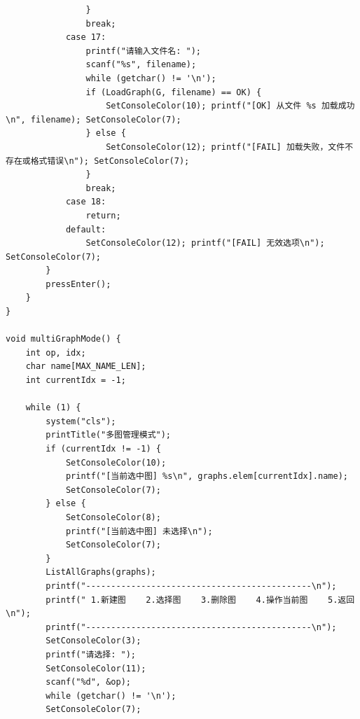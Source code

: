 \documentclass[supercite]{Experimental_Report}
\begin{document}
{\begin{lstlisting}
                }
                break;
            case 17:
                printf("请输入文件名: ");
                scanf("%s", filename);
                while (getchar() != '\n');
                if (LoadGraph(G, filename) == OK) {
                    SetConsoleColor(10); printf("[OK] 从文件 %s 加载成功\n", filename); SetConsoleColor(7);
                } else {
                    SetConsoleColor(12); printf("[FAIL] 加载失败，文件不存在或格式错误\n"); SetConsoleColor(7);
                }
                break;
            case 18:
                return;
            default:
                SetConsoleColor(12); printf("[FAIL] 无效选项\n"); SetConsoleColor(7);
        }
        pressEnter();
    }
}

void multiGraphMode() {
    int op, idx;
    char name[MAX_NAME_LEN];
    int currentIdx = -1;

    while (1) {
        system("cls");
        printTitle("多图管理模式");
        if (currentIdx != -1) {
            SetConsoleColor(10);
            printf("[当前选中图] %s\n", graphs.elem[currentIdx].name);
            SetConsoleColor(7);
        } else {
            SetConsoleColor(8);
            printf("[当前选中图] 未选择\n");
            SetConsoleColor(7);
        }
        ListAllGraphs(graphs);
        printf("---------------------------------------------\n");
        printf(" 1.新建图    2.选择图    3.删除图    4.操作当前图    5.返回\n");
        printf("---------------------------------------------\n");
        SetConsoleColor(3);
        printf("请选择: ");
        SetConsoleColor(11);
        scanf("%d", &op);
        while (getchar() != '\n');
        SetConsoleColor(7);


\end{lstlisting}}
\end{document}
